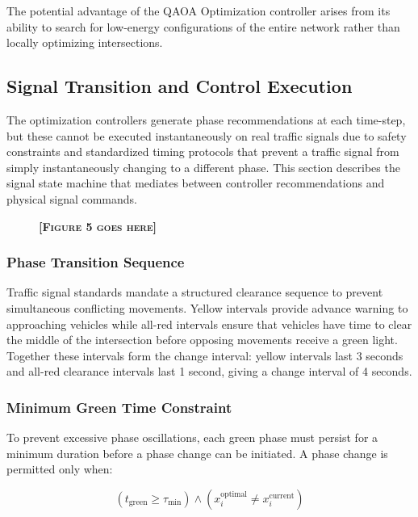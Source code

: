 \documentclass[12pt]{article}
\begin{document}
The potential advantage of the QAOA Optimization controller arises from its ability to search for low-energy configurations of the entire network rather than locally optimizing intersections.

\subsection{Signal Transition and Control Execution}
\label{sec:signal}

The optimization controllers generate phase recommendations at each time-step, but these cannot be executed instantaneously on real traffic signals due to safety constraints and standardized timing protocols that prevent a traffic signal from simply instantaneously changing to a different phase. This section describes the signal state machine that mediates between controller recommendations and physical signal commands.


\begin{figure}[htbp]
\centering
\textbf{\textsc{[Figure 5 goes here]}}
\label{fig:state-machine}
\end{figure}


\subsubsection{Phase Transition Sequence}

Traffic signal standards \cite{fhwa2009} mandate a structured clearance sequence to prevent simultaneous conflicting movements. Yellow intervals provide advance warning to approaching vehicles while all-red intervals ensure that vehicles have time to clear the middle of the intersection before opposing movements receive a green light. Together these intervals form the change interval: yellow intervals last 3 seconds and all-red clearance intervals last 1 second, giving a change interval of 4 seconds.

\subsubsection{Minimum Green Time Constraint}

To prevent excessive phase oscillations, each green phase must persist for a minimum duration before a phase change can be initiated. A phase change is permitted only when:

\begin{equation}
\label{eq:phase_change}
    (t_{\text{green}} \geq \tau_{\min}) \wedge \left(x_i^{\text{optimal}} \neq x_i^{\text{current}}\right)
\end{equation}
\end{document}
